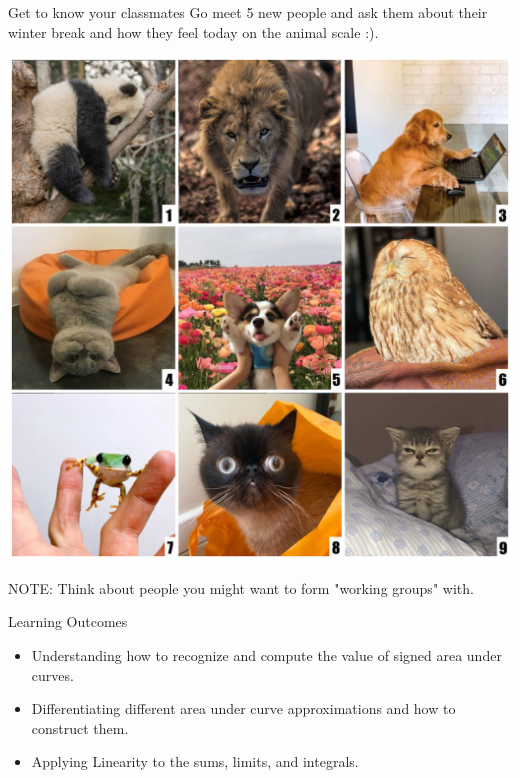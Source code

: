 \documentclass{beamer}
\begin{document}
\begin{frame}{Get to know your classmates}
    Go meet 5 new people and ask them about their winter break and how they feel today on the animal scale :). 

    \emp
    \hspace{3pt}
    \begin{center}
        \includegraphics[width=\textwidth]{animalscale.jpeg}
    \end{center}
    \emp

    NOTE: Think about people you might want to form "working groups" with. 
\end{frame}

\begin{frame}{Learning Outcomes}
    \begin{itemize}
        \item Understanding how to recognize and compute the value of signed area under curves.
        \item Differentiating different area under curve approximations and how to construct them. 
        \item Applying Linearity to the sums, limits, and integrals.
    \end{itemize}
\end{frame}
\end{document}
